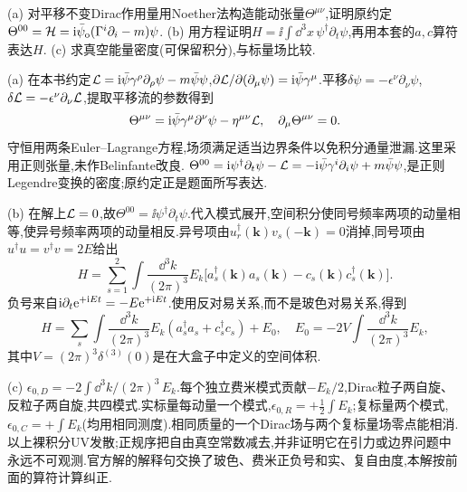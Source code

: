 \begin{exercise}
(a) 对平移不变Dirac作用量用Noether法构造能动张量$\Theta^{\mu\nu}$,证明原约定$\Theta^{00}=\mathcal H=\mathrm i\bar\psi_{\rm o}(\Gamma^i\partial_i-m)\psi$.
(b) 用方程证明$H=\ii\int\dd^3x\,\psi^\dagger\partial_t\psi$,再用本套的$a,c$算符表达$H$.
(c) 求真空能量密度(可保留积分),与标量场比较.
\end{exercise}
\begin{solution}
(a) 在本书约定$\mathcal L=\mathrm i\bar\psi\gamma^\rho\partial_\rho\psi-m\bar\psi\psi$,$\partial\mathcal L/\partial(\partial_\mu\psi)=\mathrm i\bar\psi\gamma^\mu$.平移$\delta\psi=-\epsilon^\nu\partial_\nu\psi$,$\delta\mathcal L=-\epsilon^\nu\partial_\nu\mathcal L$,提取平移流的参数得到
\[
 \Theta^{\mu\nu}=\mathrm i\bar\psi\gamma^\mu\partial^\nu\psi-\eta^{\mu\nu}\mathcal L,
 \quad\partial_\mu\Theta^{\mu\nu}=0.
\]
守恒用两条Euler--Lagrange方程,场须满足适当边界条件以免积分通量泄漏.这里采用正则张量,未作Belinfante改良.
$\Theta^{00}=\mathrm i\psi^\dagger\partial_t\psi-\mathcal L=-\mathrm i\bar\psi\gamma^i\partial_i\psi+m\bar\psi\psi$,是正则Legendre变换的密度;原约定正是题面所写表达.

(b) 在解上$\mathcal L=0$,故$\Theta^{00}=\ii\psi^\dagger\partial_t\psi$.代入模式展开,空间积分使同号频率两项的动量相等,使异号频率两项的动量相反.异号项由$u_r^\dagger(\mathbf k)v_s(-\mathbf k)=0$消掉,同号项由$u^\dagger u=v^\dagger v=2E$给出
\[
 H=\sum_{s=1}^2\int\frac{\dd^3k}{(2\pi)^3}
 E_k\big[a_s^\dagger(\mathbf k)a_s(\mathbf k)-c_s(\mathbf k)c_s^\dagger(\mathbf k)\big].
\]
负号来自$\mathrm i\partial_t\mathrm e^{+\mathrm i Et}=-E\mathrm e^{+\mathrm i Et}$.使用反对易关系,而不是玻色对易关系,得到
\[
 H=\sum_s\int\frac{\dd^3k}{(2\pi)^3}E_k(a_s^\dagger a_s+c_s^\dagger c_s)+E_0,
 \quad E_0=-2V\int\frac{\dd^3k}{(2\pi)^3}E_k,
\]
其中$V=(2\pi)^3\delta^{(3)}(0)$是在大盒子中定义的空间体积.

(c) $\epsilon_{0,D}=-2\int\dd^3k/(2\pi)^3\,E_k$.每个独立费米模式贡献$-E_k/2$,Dirac粒子两自旋、反粒子两自旋,共四模式.实标量每动量一个模式,$\epsilon_{0,R}=+\frac12\int E_k$;复标量两个模式,$\epsilon_{0,C}=+\int E_k$(均用相同测度).相同质量的一个Dirac场与两个复标量场零点能相消.以上裸积分UV发散;正规序把自由真空常数减去,并非证明它在引力或边界问题中永远不可观测.官方解的解释句交换了玻色、费米正负号和实、复自由度,本解按前面的算符计算纠正.
\end{solution}

